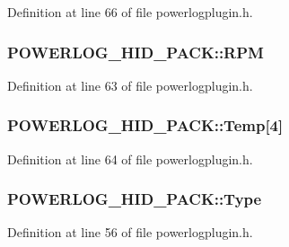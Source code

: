 Definition at line 66 of file powerlogplugin.\-h.

\hypertarget{struct_p_o_w_e_r_l_o_g___h_i_d___p_a_c_k_a037c72ffcf73e0ce8bcb6933441411bd}{
\subsubsection[{R\-P\-M}]{ P\-O\-W\-E\-R\-L\-O\-G\-\_\-\-H\-I\-D\-\_\-\-P\-A\-C\-K\-::\-R\-P\-M}}\label{struct_p_o_w_e_r_l_o_g___h_i_d___p_a_c_k_a037c72ffcf73e0ce8bcb6933441411bd}


Definition at line 63 of file powerlogplugin.\-h.

\hypertarget{struct_p_o_w_e_r_l_o_g___h_i_d___p_a_c_k_a77fb2418138dbe5af859e51cbb4532eb}{
\subsubsection[{Temp}]{ P\-O\-W\-E\-R\-L\-O\-G\-\_\-\-H\-I\-D\-\_\-\-P\-A\-C\-K\-::\-Temp\mbox{[}4\mbox{]}}}\label{struct_p_o_w_e_r_l_o_g___h_i_d___p_a_c_k_a77fb2418138dbe5af859e51cbb4532eb}


Definition at line 64 of file powerlogplugin.\-h.

\hypertarget{struct_p_o_w_e_r_l_o_g___h_i_d___p_a_c_k_a36832eaffe0839ffe2d8e88787f6a798}{
\subsubsection[{Type}]{ P\-O\-W\-E\-R\-L\-O\-G\-\_\-\-H\-I\-D\-\_\-\-P\-A\-C\-K\-::\-Type}}\label{struct_p_o_w_e_r_l_o_g___h_i_d___p_a_c_k_a36832eaffe0839ffe2d8e88787f6a798}


Definition at line 56 of file powerlogplugin.\-h.

